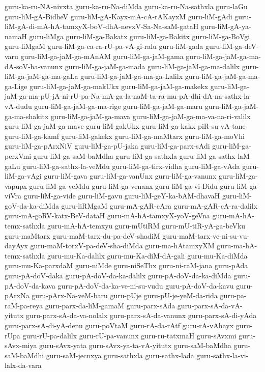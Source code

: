 {guru-ka-ru-NA-nivxta
guru-ka-ru-Na-diMda
guru-ka-ru-Na-sathxla
guru-laGu
guru-liM-gA-BidheV
guru-liM-gA-Kayx-mA-cA-rAKayxM
guru-liM-gAdi
guru-liM-gA-di-mA-hA-tamxyX-boV-dhA-nevxV-Sa-Na-saM-gataH
guru-liM-gA-ya-namaH
guru-liMga
guru-liM-ga-Bakatx
guru-liM-ga-Bakitx
guru-liM-ga-BoVgi
guru-liMgaM
guru-liM-ga-ca-ra-rU-pa-vA-gi-ralu
guru-liM-gada
guru-liM-ga-deV-varu
guru-liM-ga-jaM-ga-mAnAM
guru-liM-ga-jaM-gama
guru-liM-ga-jaM-ga-ma-dA-soV-ha-vanunx
guru-liM-ga-jaM-ga-mada
guru-liM-ga-jaM-ga-ma-dalilx
guru-liM-ga-jaM-ga-ma-gaLa
guru-liM-ga-jaM-ga-ma-ga-Lalilx
guru-liM-ga-jaM-ga-ma-ga-Lige
guru-liM-ga-jaM-ga-makUkx
guru-liM-ga-jaM-ga-makekx
guru-liM-ga-jaM-ga-ma-pU-jA-ni-rU-pa-Na-mA-ga-la-naM-ta-ra-mu-pA-dhi-dA-na-sathx-la-vA-dudu
guru-liM-ga-jaM-ga-ma-rige
guru-liM-ga-jaM-ga-maru
guru-liM-ga-jaM-ga-ma-shakitx
guru-liM-ga-jaM-ga-mava
guru-liM-ga-jaM-ga-ma-va-na-ri-valilx
guru-liM-ga-jaM-ga-mave
guru-liM-gakUkx
guru-liM-ga-kakx-piR-su-vA-tane
guru-liM-ga-kamf
guru-liM-gakekx
guru-liM-ga-maMtarx
guru-liM-ga-moVhi
guru-liM-ga-pArxNiV
guru-liM-ga-pU-jaka
guru-liM-ga-parx-sAdi
guru-liM-ga-perxVmi
guru-liM-ga-saM-baMdha
guru-liM-ga-sathxla
guru-liM-ga-sathx-laM-gaLu
guru-liM-ga-sathx-la-veMdu
guru-liM-ga-tirx-vidha
guru-liM-ga-vAda
guru-liM-ga-vAgi
guru-liM-gava
guru-liM-ga-vanUnx
guru-liM-ga-vanunx
guru-liM-ga-vapupx
guru-liM-ga-veMdu
guru-liM-ga-venanx
guru-liM-ga-vi-Didu
guru-liM-ga-viVra
guru-liM-ga-vide
guru-liM-gavu
guru-liM-geY-ka-bAM-dhavaH
guru-liM-goV-da-ka-diMda
guru-liRMgaM
guru-mA-gAR-cAra
guru-mA-gAR-cA-ra-dalilx
guru-mA-goRV-katx-BeV-dataH
guru-mA-hA-tamxyX-yoV-geVna
guru-mA-hA-temx-sathxla
guru-mA-hA-temxyu
guru-mUtiRM
guru-mU-tiR-yA-ga-beVku
guru-maMtarx
guru-maM-tarx-du-pa-deV-shadiM
guru-maM-tarx-ve-ni-su-vu-dayAyx
guru-maM-torxV-pa-deV-sha-diMda
guru-ma-hAtamxyXM
guru-ma-hA-temx-sathxla
guru-mu-Ka-dalilx
guru-mu-Ka-diM-dA-gali
guru-mu-Ka-diMda
guru-mu-Ka-parxdaM
guru-niMde
guru-niSeThx
guru-ni-raM-jana
guru-pAda
guru-pA-doV-daka
guru-pA-doV-da-ka-dalilx
guru-pA-doV-da-ka-diMda
guru-pA-doV-da-kava
guru-pA-doV-da-ka-ve-ni-su-vudu
guru-pA-doV-da-kavu
guru-pArxNa
guru-pArx-Na-veM-baru
guru-pUje
guru-pU-je-yeM-da-rida
guru-pa-raM-pa-reya
guru-parx-da-liM-gamaM
guru-parx-sAda
guru-parx-sA-da-vA-yitutx
guru-parx-sA-da-va-nolalx
guru-parx-sA-da-vanunx
guru-parx-sA-di-yAda
guru-parx-sA-di-yA-denu
guru-poVtaM
guru-rA-da-rAtf
guru-rA-vAhayx
guru-rUpa
guru-rU-pa-dalilx
guru-rU-pa-vanunx
guru-ru-tatxmaH
guru-sAvxmi
guru-sAvx-miya
guru-sAvx-yata
guru-sAvx-ya-ta-vA-yitutx
guru-saM-baMdha
guru-saM-baMdhi
guru-saM-jecnxya
guru-sathxla
guru-sathx-lada
guru-sathx-la-vi-lalx-da-vara
}

